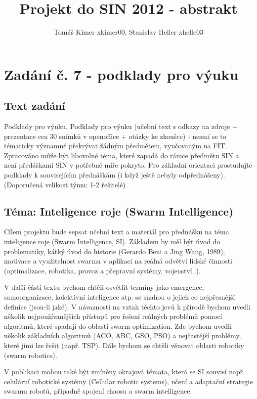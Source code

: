 \documentclass[a4paper,12pt]{article}
\title{Projekt do SIN 2012 - abstrakt}
\author{Tomáš Kimer xkimer00, Stanislav Heller xhelle03}
\begin{document}
\maketitle

\section*{Zadání č. 7 - podklady pro výuku}
\vspace{5mm}
\subsection*{Text zadání}
Podklady pro výuku. Podklady pro výuku (učební text s odkazy na zdroje
+ prezentace cca 30 snímků v openoffice + otázky ke zkoušce) - nesmí se
to tématicky významně překrývat žádným předmětem, vyučovaným na FIT.
Zpracováno může být libovolné téma, které zapadá do rámce předmětu SIN
a není předáškami SIN v potřebné míře pokryto. Pro základní orientaci
prostudujte podklady k souvisejícím přednáškám (i když ještě nebyly
odpřednášeny). (Doporučená velikost týmu: 1-2 řešitelé)

\subsection*{Téma: Inteligence roje (Swarm Intelligence)}
Cílem projektu bude sepsat učební text a materiál pro přednášku na téma
inteligence roje (Swarm Intelligence, SI). Základem by měl být úvod do problematiky,
kátký úvod do historie (Gerardo Beni a Jing Wang, 1989), motivace a využitelnost
swarmu v aplikaci na reálná odvětví lidské činnosti (optimalizace, robotika,
provoz a přepravní systémy, vojenství..).

V další části textu bychom chtěli osvětlit termíny jako emergence, samoorganizace,
kolektivní inteligence atp. se snahou o jejich co nejpřesnější definice (jsou-li jaké).
V návaznosti na vztah těchto jevů k přírodě bychom uvedli několik nejpoužívanějších
přístupů pro řešení reálných problémů pomocí algoritmů, které spadají do oblasti
swarm optimization. Zde bychom uvedli několik základních algoritmů (ACO, ABC, GSO, PSO)
a nejčastější problémy, které jimi lze řešit (např. TSP). Dále bychom se chtěli
věnovat oblasti robotiky (swarm robotics).

V publikaci mohou také být zmíněny okrajová témata, která se SI souvisí např.
celulární robotické systémy (Cellular robotic systems), učení a adaptační strategie
swarmu robotů, případně spojení chaosu a swarm intelligence.
\end{document}
